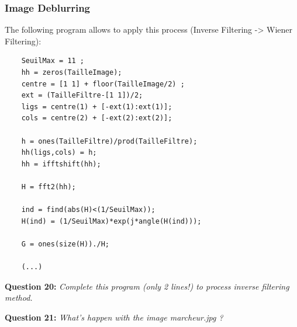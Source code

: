 \TODO{}


\subsubsection{Image Deblurring}

The following program allows to apply this process (Inverse Filtering -> Wiener Filtering):
\begin{lstlisting}
    SeuilMax = 11 ;
    hh = zeros(TailleImage);
    centre = [1 1] + floor(TailleImage/2) ;
    ext = (TailleFiltre-[1 1])/2;
    ligs = centre(1) + [-ext(1):ext(1)];
    cols = centre(2) + [-ext(2):ext(2)];
    
    h = ones(TailleFiltre)/prod(TailleFiltre);
    hh(ligs,cols) = h;
    hh = ifftshift(hh);
    
    H = fft2(hh);
    
    ind = find(abs(H)<(1/SeuilMax));
    H(ind) = (1/SeuilMax)*exp(j*angle(H(ind)));
    
    G = ones(size(H))./H;
    
    (...)
\end{lstlisting}


\textbf{Question 20:}
\textit{Complete this program (only 2 lines!) to process inverse ﬁltering method.}

\TODO{}

\textbf{Question 21:}
\textit{What’s happen with the image marcheur.jpg ?}

\TODO{}
